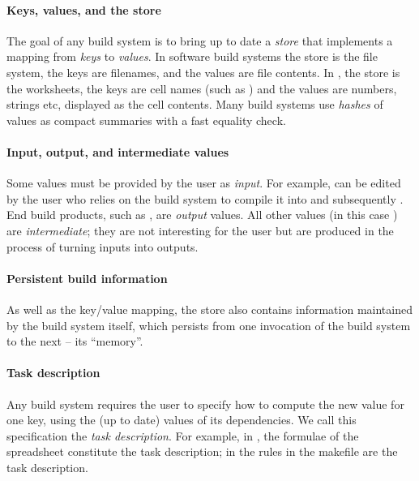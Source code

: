 \vspace{-2mm}
\paragraph{Keys, values, and the store} The goal of any build system is to
bring up to date a \emph{store} that implements a mapping from \emph{keys} to
\emph{values}. In software build systems the store is the file system, the
keys are filenames, and the values are file contents. In \Excel, the store is
the worksheets, the keys are cell names (such as ) and the values are
numbers, strings etc, displayed as the cell contents. Many build systems use
\emph{hashes} of values as compact summaries with a fast equality check.

\vspace{-2mm}
\paragraph{Input, output, and intermediate values}
Some values must be provided by the user as \emph{input}. For example,
 can be edited by the user who relies on the build system to
compile it into  and subsequently . End build products,
such as , are \emph{output} values. All other values (in this case
) are \emph{intermediate}; they are not interesting for the user
but are produced in the process of turning inputs into outputs.

\vspace{-2mm}
\paragraph{Persistent build information} As well as the key/value mapping, the store
also contains information maintained by the build system itself, which persists
from one invocation of the build system to the next -- its ``memory''.

\vspace{-2mm}
\paragraph{Task description} Any build system requires the user to specify how to
compute the new value for one key, using the (up to date) values of its
dependencies. We call this specification the \emph{task description}.  For
example, in \Excel, the formulae of the spreadsheet constitute the task
description; in \Make the rules in the makefile are the task description.

